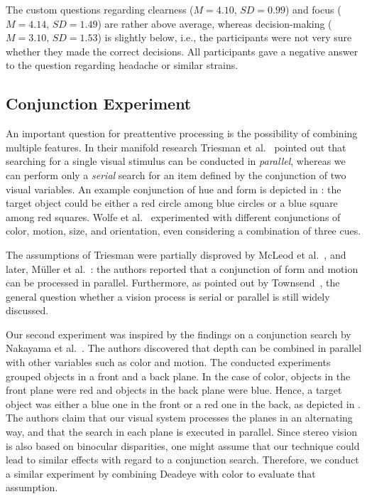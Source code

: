 \documentclass[journal]{vgtc}                %
\begin{document}
The custom questions regarding clearness ($M = 4.10,\,SD = 0.99$) and focus ($M = 4.14,\,SD = 1.49$) are rather above average, whereas decision-making ($M = 3.10,\,SD = 1.53$) is slightly below, i.e., the participants were not very sure whether they made the correct decisions. All participants gave a negative answer to the question regarding headache or similar strains.


%
%
%



\subsection{Conjunction Experiment}

An important question for preattentive processing is the possibility of combining multiple features. In their manifold research Triesman et al.~\cite{treisman1980feature, treisman1988feature, treisman1986illusory} pointed out that searching for a single visual stimulus can be conducted in \textit{parallel}, whereas we can perform only a \textit{serial} search for an item defined by the conjunction of two visual variables. An example conjunction of hue and form is depicted in : the target object could be either a red circle among blue circles or a blue square among red squares. Wolfe et al.~\cite{wolfe1989guided} experimented with different conjunctions of color, motion, size, and orientation, even considering a combination of three cues.


The assumptions of Triesman were partially disproved by McLeod et al.~\cite{mcleod1988visual}, and later, M\"uller et al.~\cite{muller1999visual}: the authors reported that a conjunction of form and motion can be processed in parallel. Furthermore, as pointed out by Townsend~\cite{townsend1990serial}, the general question whether a vision process is serial or parallel is still widely discussed.

Our second experiment was inspired by the findings on a conjunction search by Nakayama et al.~\cite{nakayama1986serial}. The authors discovered that depth can be combined in parallel with other variables such as color and motion. The conducted experiments grouped objects in a front and a back plane. In the case of color, objects in the front plane were red and objects in the back plane were blue. Hence, a target object was either a blue one in the front or a red one in the back, as depicted in . The authors claim that our visual system processes the planes in an alternating way, and that the search in each plane is executed in parallel. Since stereo vision is also based on binocular disparities, one might assume that our technique could lead to similar effects with regard to a conjunction search. Therefore, we conduct a similar experiment by combining Deadeye with color to evaluate that assumption.
\end{document}
